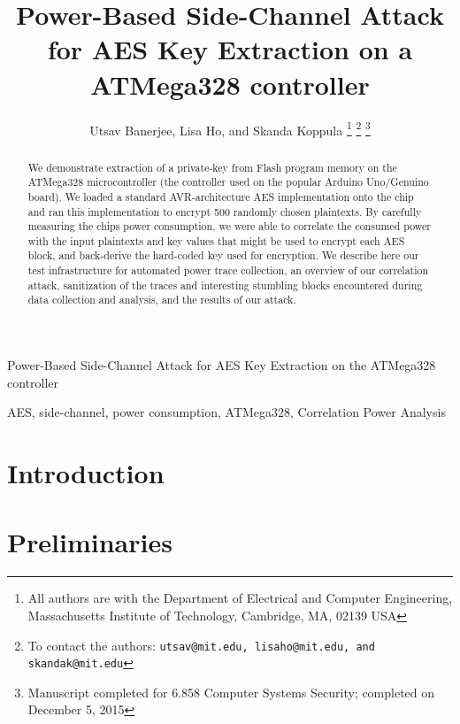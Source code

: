 \documentclass[journal]{ieee_style}
\begin{document}
\title{Power-Based Side-Channel Attack for AES Key Extraction on a ATMega328 controller}

\author{Utsav Banerjee,
        Lisa Ho,
        and Skanda Koppula%
\thanks{All authors are with the Department
of Electrical and Computer Engineering, Massachusetts Institute of Technology, Cambridge,
MA, 02139 USA}%
\thanks{To contact the authors: \tt{utsav@mit.edu}, \tt{lisaho@mit.edu}, and \tt{skandak@mit.edu}}%
\thanks{Manuscript completed for 6.858 Computer Systems Security; completed on December 5, 2015}}


%
{Power-Based Side-Channel Attack for AES Key Extraction on the ATMega328 controller}
\maketitle

\begin{abstract}
    We demonstrate extraction of a private-key from Flash program memory on the ATMega328 microcontroller (the controller used on the popular Arduino Uno/Genuino board). We loaded a standard AVR-architecture AES implementation onto the chip and ran this implementation to encrypt 500 randomly chosen plaintexts. By carefully measuring the chips power consumption, we were able to correlate the consumed power with the input plaintexts and key values that might be used to encrypt each AES block, and back-derive the hard-coded key used for encryption. We describe here our test infrastructure for automated power trace collection, an overview of our correlation attack, sanitization of the traces and interesting stumbling blocks encountered during data collection and analysis, and the results of our attack.
\end{abstract}

\begin{IEEEkeywords}
AES, side-channel, power consumption, ATMega328, Correlation Power Analysis
\end{IEEEkeywords}

\section{Introduction}

\section{Preliminaries}
\end{document}
